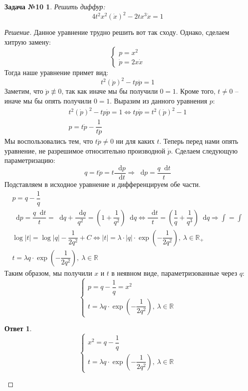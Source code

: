 \documentclass[a4paper,12pt]{article}
\newtheorem*{task10}{Задача №10}
\newtheorem*{ans}{Ответ}
\newcommand{\R}{\mathbb{R}}
\renewcommand*\d{\mathop{}\!\mathrm{d}}
\newcommand{\dpp}{\dot{p}}
\newcommand{\dx}{\dot{x}}
\newcommand{\bto}{\Longrightarrow}
\newcommand{\ds}{\displaystyle}
\begin{document}
\begin{task10}
	Решить диффур:
	\[4t^2x^2(\dx)^2 - 2tx^3\dx = 1\]
\end{task10}
\begin{proof}[Решение]
	Данное уравнение трудно решить вот так сходу. Однако, сделаем хитрую замену:
	\[\begin{cases}
	p = x^2\\
	\dpp = 2x\dx
	\end{cases}\]
	Тогда наше уравнение примет вид:
	\[t^2(\dpp)^2 - tp\dpp = 1\]
	Заметим, что $\dpp \not\equiv 0$, так как иначе мы бы получили $0 = 1$. Кроме того, $t \neq 0$ -- иначе мы бы опять получили $0 = 1$. Выразим из данного уравнения $p$:
	\begin{gather*}
	t^2(\dpp)^2 - tp\dpp = 1 \iff tp\dpp = t^2(\dpp)^2 - 1\\
	p = t\dpp - \dfrac{1}{t\dpp}
	\end{gather*}
	Мы воспользовались тем, что $t\dpp \neq 0$ ни для каких $t$.  Теперь перед нами опять уравнение, не разрешимое относительно производной $\dpp$. Сделаем следующую параметризацию:
	\[q = t\dpp = t\dfrac{\d p}{\d t} \bto \d p = \dfrac{q\d t}{t}\]
	Подставляем в исходное уравнение и дифференцируем обе части.
	\begin{gather*}
	p = q - \dfrac{1}{q}\\
	\d p = \dfrac{q\d t}{t} = \d q + \dfrac{\d q}{q^2} = \left(1 + \dfrac{1}{q^2}\right)\d q \iff \dfrac{\d t}{t} = \left(\dfrac{1}{q} + \dfrac{1}{q^3}\right)\d q \bto \ds\int = \int\\
	\log|t| = \log|q| - \dfrac{1}{2q^2} + C \iff |t| = \lambda \cdot |q| \cdot \exp(-\dfrac{1}{2q^2}),\ \lambda \in \R_+ \\
	t = \lambda q \cdot \exp(-\dfrac{1}{2q^2}),\ \lambda \in \R
	\end{gather*}
	Таким образом, мы получили $x$ и $t$ в неявном виде, параметризованные через $q$:
	\[\begin{cases}
	p = q - \dfrac{1}{q} = x^2\\
	t = \lambda q \cdot \exp(-\dfrac{1}{2q^2}),\ \lambda \in \R
	\end{cases}\]
	\begin{ans}
		\[\begin{cases}
		x^2 = q - \dfrac{1}{q}\\
		t = \lambda q \cdot \exp(-\dfrac{1}{2q^2}),\ \lambda \in \R
		\end{cases}\]
	\end{ans}
\end{proof}
\end{document}
